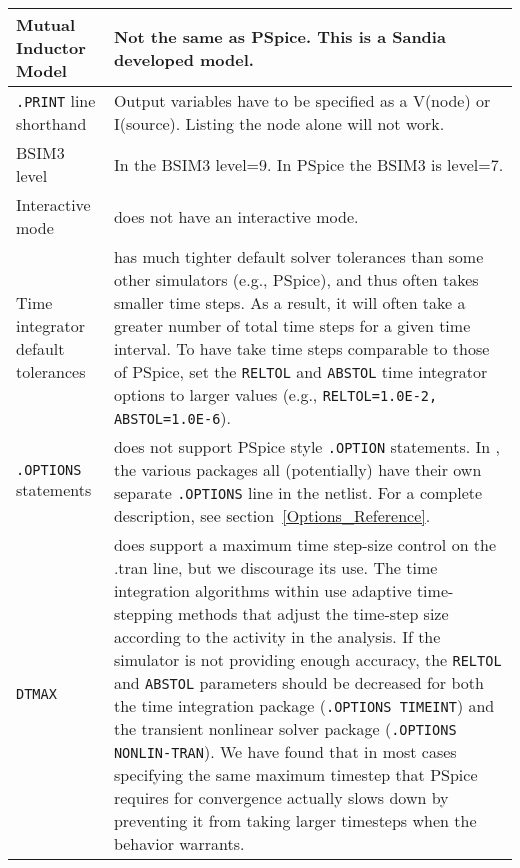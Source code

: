 \begin{longtable}[h] {>{\raggedright\small}m{2in}|>{\raggedright\let\\\tabularnewline\small}m{4in}}
Mutual Inductor Model & Not the same as PSpice.  This is a Sandia developed
model. \\ \hline

\texttt{.PRINT} line shorthand & Output variables have to be specified as a
V(node) or I(source). Listing the node alone will not work. \\ \hline

BSIM3 level & In \Xyce{} the BSIM3 level=9.  In PSpice the BSIM3 is
level=7. \\ \hline

Interactive mode & \Xyce{} does not have an interactive mode.  \\ \hline

Time integrator default tolerances & \Xyce{} has much tighter default solver
tolerances than some other simulators (e.g., PSpice), and thus often takes
smaller time steps.  As a result, it will often take a greater number of total
time steps for a given time interval.  To have \Xyce{} take time steps
comparable to those of PSpice, set the \texttt{RELTOL} and \texttt{ABSTOL} time
integrator options to larger values (e.g., \texttt{RELTOL=1.0E-2, ABSTOL=1.0E-6}).
\\ \hline

{\tt.OPTIONS} statements \index{\texttt{.OPTIONS}} & \Xyce{} does 
not support PSpice style
\texttt{.OPTION} statements. In \Xyce{}, the various packages all (potentially)
have their own separate \texttt{.OPTIONS} line in the netlist.  For a complete
description, see section~\ref{Options_Reference}.  \\ \hline

\texttt{DTMAX} & \Xyce{} does support a maximum time step-size
control on the .tran line, but we discourage its use. The time 
integration\index{solvers!time integration}
\index{algorithm!time integration} algorithms within
\Xyce{} use adaptive time-stepping methods that adjust the time-step
size\index{time step!size} according to the activity in the analysis.  If the
simulator is not providing enough accuracy, the \texttt{RELTOL} and
\texttt{ABSTOL} parameters should be decreased for both the time integration
package (\texttt{.OPTIONS TIMEINT}) and the transient nonlinear solver package
(\texttt{.OPTIONS NONLIN-TRAN}).  We have found that in most cases specifying 
the same maximum timestep that PSpice requires for convergence actually 
slows \Xyce{} down by preventing it from taking larger timesteps when the 
behavior warrants.  \\ \hline


\end{longtable}
